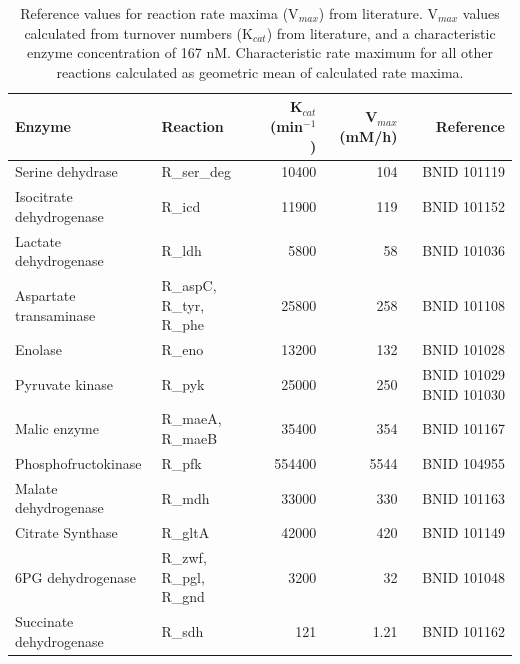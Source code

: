 \documentclass[12pt]{article}
\begin{document}
\begin{table}
\centering
 \caption{Reference values for reaction rate maxima (V$_{max}$) from literature. V$_{max}$ values calculated from turnover numbers (K$_{cat}$) from literature, and a characteristic enzyme concentration of 167 nM. Characteristic rate maximum for all other reactions calculated as geometric mean of calculated rate maxima.}
 \renewcommand{\arraystretch}{1.3}
 \begin{tabular}{llrrr} \toprule
\phantom{i}\textbf{Enzyme} & \textbf{Reaction} & \textbf{K$_{cat}$ (min$^{-1}$)} & 
 \textbf{V$_{max}$ (mM/h)} & \textbf{Reference} \\ \hline
\phantom{i}Serine dehydrase & R\_ser\_deg & 10400 & 104 & BNID 101119 \\ \hline
\phantom{i}Isocitrate dehydrogenase & R\_icd & 11900 & 119 & BNID 101152 \\ \hline
\phantom{i}Lactate dehydrogenase & R\_ldh & 5800 & 58 & BNID 101036 \\ \hline
\smallskip
\rule{0pt}{4.5ex}
Aspartate transaminase & \parbox{1 cm}{R\_aspC, R\_tyr, R\_phe} & 25800 & 258 & BNID 101108 \\ \hline
\phantom{i}Enolase & R\_eno & 13200 & 132 & BNID 101028 \\ \hline
\smallskip
\rule{0pt}{3ex}
Pyruvate kinase & R\_pyk & 25000 & 250 & \parbox{2.52 cm}{BNID 101029 BNID 101030} \\ \hline
\smallskip
\rule{0pt}{3ex}
Malic enzyme & \parbox{1 cm}{R\_maeA, R\_maeB} & 35400 & 354 & BNID 101167 \\ \hline
\phantom{i}Phosphofructokinase & R\_pfk & 554400 & 5544 & BNID 104955 \\ \hline
\phantom{i}Malate dehydrogenase & R\_mdh & 33000 & 330 & BNID 101163 \\ \hline
\phantom{i}Citrate Synthase & R\_gltA & 42000 & 420 & BNID 101149 \\ \hline
\smallskip
\rule{0pt}{4.5ex}
6PG dehydrogenase & \parbox{1 cm}{R\_zwf, R\_pgl, R\_gnd} &3200 & 32 & BNID 101048 \\ \hline
\phantom{i}Succinate dehydrogenase & R\_sdh & 121 & 1.21 & BNID 101162 \\ \hline

\end{tabular}
\end{table}
\end{document}
